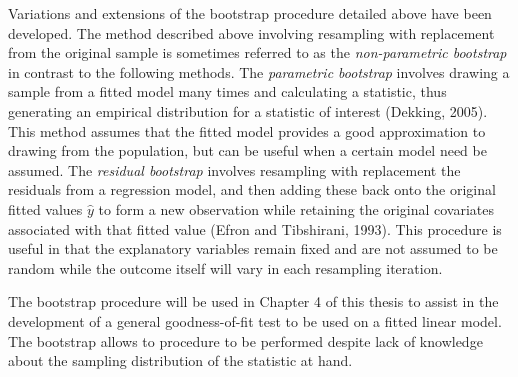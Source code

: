 		Variations and extensions of the bootstrap procedure detailed above have been developed. The method described above involving resampling with replacement from the original sample is sometimes
		referred to as the \textit{non-parametric bootstrap} in contrast to the following methods. The \textit{parametric bootstrap} involves drawing a sample from a fitted model many times and calculating
		a statistic, thus generating an empirical distribution for a statistic of interest (Dekking, 2005). This method assumes that the fitted model provides a good approximation to drawing from the
		population, but can be useful when a certain model need be assumed. The \textit{residual bootstrap} involves resampling with replacement the residuals from a regression model, and then adding
		these back onto the original fitted values $\hat{y}$ to form a new observation while retaining the original covariates associated with that fitted value (Efron and Tibshirani, 1993). This procedure
		is useful in that the explanatory variables remain fixed and are not assumed to be random while the outcome itself will vary in each resampling iteration.

		The bootstrap procedure will be used in Chapter 4 of this thesis to assist in the development of a general goodness-of-fit test to be used on a fitted linear model. The bootstrap allows to procedure
		to be performed despite lack of knowledge about the sampling distribution of the statistic at hand.



		